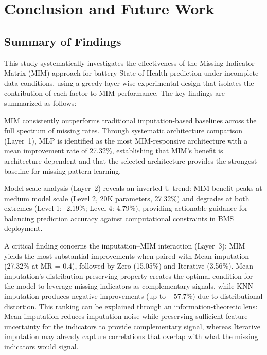 \documentclass[5p,times]{elsarticle}
\begin{document}
\section{Conclusion and Future Work}\label{sec:conclusion}

\subsection{Summary of Findings}\label{sec:findings}

This study systematically investigates the effectiveness of the Missing Indicator Matrix (MIM) approach for battery State of Health prediction under incomplete data conditions, using a greedy layer-wise experimental design that isolates the contribution of each factor to MIM performance. The key findings are summarized as follows:

MIM consistently outperforms traditional imputation-based baselines across the full spectrum of missing rates. Through systematic architecture comparison (Layer~1), MLP is identified as the most MIM-responsive architecture with a mean improvement rate of 27.32\%, establishing that MIM's benefit is architecture-dependent and that the selected architecture provides the strongest baseline for missing pattern learning.

Model scale analysis (Layer~2) reveals an inverted-U trend: MIM benefit peaks at medium model scale (Level 2, 20K parameters, 27.32\%) and degrades at both extremes (Level 1: -2.19\%; Level 4: 4.79\%), providing actionable guidance for balancing prediction accuracy against computational constraints in BMS deployment.

A critical finding concerns the imputation--MIM interaction (Layer~3): MIM yields the most substantial improvements when paired with Mean imputation (27.32\% at MR = 0.4), followed by Zero (15.05\%) and Iterative (3.56\%). Mean imputation's distribution-preserving property creates the optimal condition for the model to leverage missing indicators as complementary signals, while KNN imputation produces negative improvements (up to $-57.7\%$) due to distributional distortion. This ranking can be explained through an information-theoretic lens: Mean imputation reduces imputation noise while preserving sufficient feature uncertainty for the indicators to provide complementary signal, whereas Iterative imputation may already capture correlations that overlap with what the missing indicators would signal.
\end{document}
